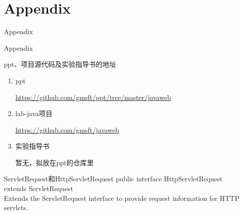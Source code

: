 \documentclass{beamer}
\begin{document}
\section{Appendix}

\begin{frame}
\Huge{\centerline{Appendix}}
\end{frame}
\begin{frame}{Appendix}
\begin{block}{ppt、项目源代码及实验指导书的地址}
\begin{enumerate}
\item
ppt

\url{https://github.com/gmsft/ppt/tree/master/javaweb}
\item
lab-java项目

\url{https://github.com/gmsft/javaweb}

\item
实验指导书

暂无，拟放在ppt的仓库里
\end{enumerate}
\end{block}
\end{frame}

\begin{frame}{ServletRequest和HttpServletRequest}
public interface HttpServletRequest\\
extends ServletRequest\\
Extends the ServletRequest interface to provide request information for HTTP servlets.
\end{frame}

\end{document}

